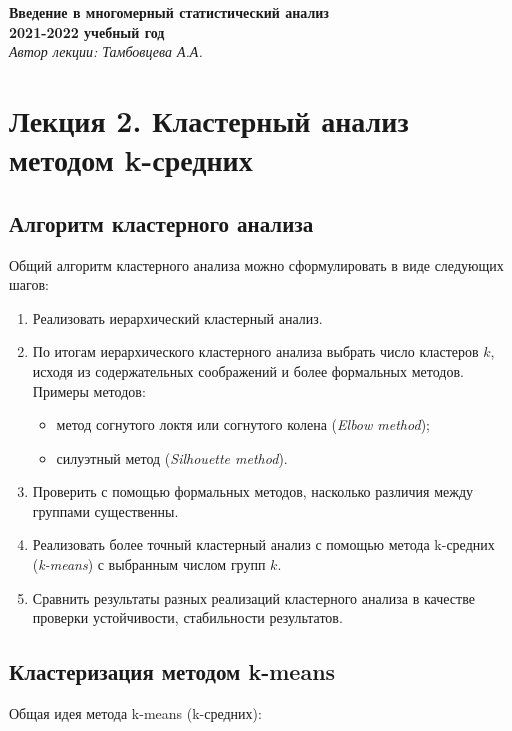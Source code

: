 \documentclass[12pt,a4paper]{article}
\theoremstyle{definition}
\begin{document}
\textbf{Введение в многомерный статистический анализ\\
2021-2022 учебный год}\medskip\\
\textit{Автор лекции: Тамбовцева А.А.}

\section*{Лекция 2. Кластерный анализ методом k-средних}
\setcounter{section}{1}

\subsection{Алгоритм кластерного анализа} 

Общий алгоритм кластерного анализа можно сформулировать 
в виде следующих шагов:

\begin{enumerate}
\item Реализовать иерархический кластерный анализ.
\item По итогам иерархического кластерного анализа выбрать число
кластеров $k$, исходя из содержательных соображений и более 
формальных методов. Примеры методов:

\begin{itemize}
\item метод согнутого локтя или согнутого колена 
(\textit{Elbow method});
\item силуэтный метод (\textit{Silhouette method}).
\end{itemize}

\item Проверить с помощью формальных методов, насколько различия 
между группами существенны.

\item Реализовать более точный кластерный анализ с помощью метода 
k-средних (\textit{k-means}) с выбранным числом групп $k$.

\item Сравнить результаты разных реализаций кластерного анализа 
в качестве проверки устойчивости, стабильности результатов.
\end{enumerate}

\subsection{Кластеризация методом k-means} 

Общая идея метода k-means (k-средних):
\end{document}
